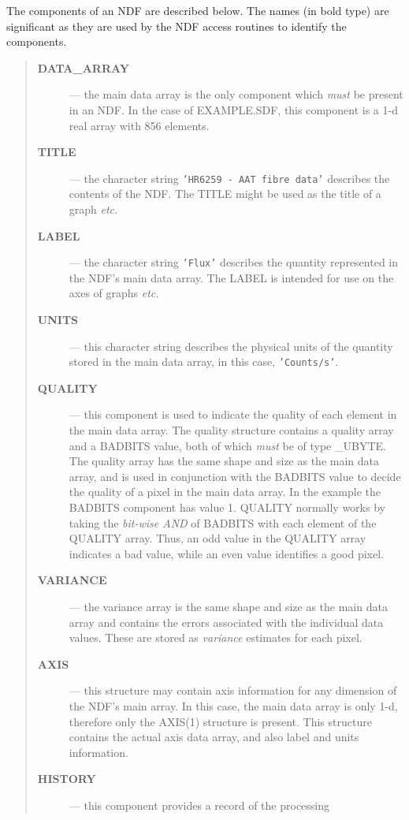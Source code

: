 The components of an NDF are described below.
The names (in bold type) are significant as they are used by the NDF 
access routines to identify the components.

\begin{quote}
\begin{description}

\item[{\bf DATA\_ARRAY}] --- the main data array is the only component which
 {\em must} be present in an NDF. 
 In the case of EXAMPLE.SDF, this component is a 1-d real array with 856
 elements.
\item[{\bf TITLE}] --- the  character string {\tt'HR6259 - AAT fibre data'}
 describes the contents of the NDF.
 The TITLE might be used as the title of a graph {\it etc.}
\item[{\bf LABEL}] --- the character string {\tt'Flux'} describes the
 quantity represented in the NDF's main data array.
 The LABEL is intended for use on the axes of graphs {\it etc.}
\item[{\bf UNITS}] --- this character string describes the physical units of
 the quantity stored in the main data array, in this case, {\tt'Counts/s'}.
\item[{\bf QUALITY}] --- this component is used to indicate the quality of
 each element in the main data array.
 The quality structure contains a quality array and a BADBITS value, both of
 which {\sl must\/} be of type \_UBYTE.
 The quality array has the same shape and size as the main data array, and is
 used in conjunction with the BADBITS value to decide the quality of a pixel
 in the main data array.
 In the example the BADBITS component has value 1.
 QUALITY normally works by taking the {\em bit-wise AND} of BADBITS with
 each element of the QUALITY array.
 Thus, an odd value in the QUALITY array indicates a bad value, while an even
 value identifies a good pixel. 
\item[{\bf VARIANCE}] --- the variance array is the same shape and size as the
 main data array and contains the errors associated with the individual data
 values. 
 These are stored as {\sl variance\/} estimates for each pixel. 
\item[{\bf AXIS}] --- this structure may contain axis information for any
 dimension of the NDF's main array.
 In this case, the main data array is only 1-d, therefore only the AXIS(1) 
 structure is present.
 This structure contains the actual axis data array, and also label and units
 information.
\item[{\bf HISTORY}] --- this component provides a record of the processing

\end{description}
\end{quote}

